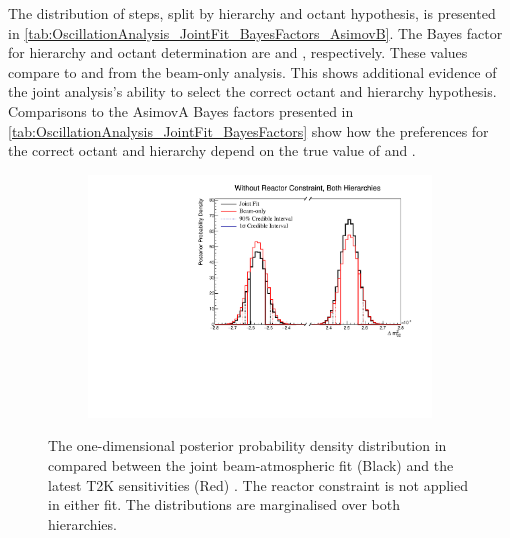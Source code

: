 The distribution of steps, split by hierarchy and octant hypothesis, is presented in \autoref{tab:OscillationAnalysis_JointFit_BayesFactors_AsimovB}. The Bayes factor for hierarchy and octant determination are  and , respectively.
These values compare to  and  from the beam-only analysis. This shows additional evidence of the joint analysis's ability to select the correct octant and hierarchy hypothesis. Comparisons to the AsimovA Bayes factors presented in \autoref{tab:OscillationAnalysis_JointFit_BayesFactors} show how the preferences for the correct octant and hierarchy depend on the true value of  and .

\begin{figure}[h]
  \begin{subfigure}[t]{0.98\textwidth}
    \includegraphics[width=\textwidth, trim={0mm 0mm 0mm 0mm}, clip,page=1]{Figures/OA/JointFit_OA2020_Comp_AsimovB/ContourComparison_1D_dm32_BH_2_woRC_UnSmeared_CredibleInterval.pdf}
  \end{subfigure}
  \caption{The one-dimensional posterior probability density distribution in  compared between the joint beam-atmospheric fit (Black) and the latest T2K sensitivities (Red) \cite{Dunne2020-uf, t2k_tn_393}. The reactor constraint is not applied in either fit. The distributions are marginalised over both hierarchies.}
  \label{fig:OscillationAnalysis_JointFit_AsimovB_DELM23}
\end{figure}

